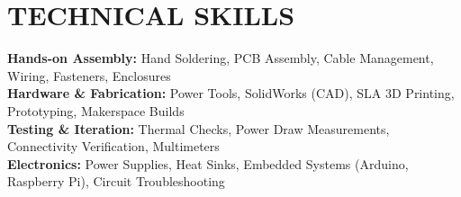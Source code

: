 \documentclass[letterpaper,11pt]{article}
\begin{document}
\section{TECHNICAL SKILLS}
 \begin{itemize}[leftmargin=0.15in, label={}]
    \small{\item{
     \textbf{Hands-on Assembly:} Hand Soldering, PCB Assembly, Cable Management, Wiring, Fasteners, Enclosures \\
     \textbf{Hardware \& Fabrication:} Power Tools, SolidWorks (CAD), SLA 3D Printing, Prototyping, Makerspace Builds \\
     \textbf{Testing \& Iteration:} Thermal Checks, Power Draw Measurements, Connectivity Verification, Multimeters \\
     \textbf{Electronics:} Power Supplies, Heat Sinks, Embedded Systems (Arduino, Raspberry Pi), Circuit Troubleshooting
    }}
 \end{itemize}


\end{document}
